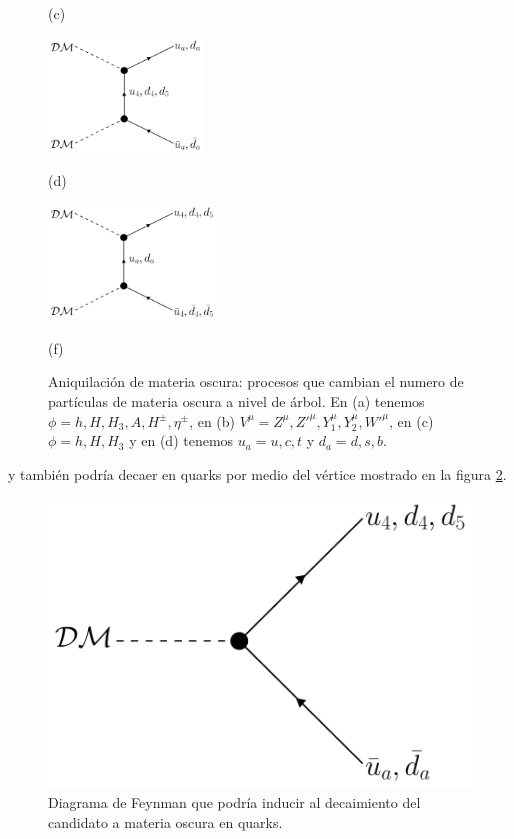 \begin{figure}[h]
\begin{minipage}{.35\textwidth}
  \caption*{(c)}
\end{minipage}%
\vspace{0.25in}
\centering
\begin{minipage}{.35\textwidth}
  \centering
  \includegraphics[height=1.2in]{Images/DM_ann_4.pdf}
  \caption*{(d)}
\end{minipage}%
\begin{minipage}{.35\textwidth}
  \centering
  \includegraphics[height=1.2in]{Images/DM_ann_6.pdf}
  \caption*{(f)}
\end{minipage}%
\caption[\hspace{0.05in}Aniquilación de materia oscura en el $\nu_R-$331]{Aniquilación de materia oscura: procesos que cambian el numero de partículas de materia oscura a nivel de árbol. En (a) tenemos $\phi=h,H,H_3, A,H^{\pm},\eta^{\pm}$, en (b) $V^{\mu} = Z^{\mu},Z'^{\mu},Y_1^{\mu},Y_2^{\mu},W'^{\mu}$, en (c) $\phi = h,H,H_3$ y en (d) tenemos $u_a=u,c,t$ y $d_a=d,s,b$.} 
\label{Feynman_diagrams}
\end{figure}
y también podría decaer en quarks por medio del vértice mostrado en la figura \ref{fig:DMdecay}.
\begin{figure}[h]
\centering
\includegraphics[scale=0.35]{Images/DM_decay.pdf}
\caption[\hspace{0.05in}Posible canal de decaimiento de la materia oscura]{Diagrama de Feynman que podría inducir al decaimiento del candidato a materia oscura en quarks.}
\label{fig:DMdecay}
\end{figure}
